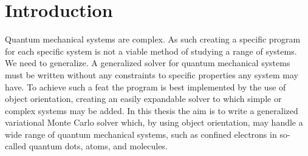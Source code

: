 \chapter*{Introduction}



Quantum mechanical systems are complex. As such creating a specific
program for each specific system is not a viable method of studying a
range of systems. We need to generalize. A generalized solver for
quantum mechanical systems must be written without any constraints to
specific properties any system may have. To achieve such a feat the
program is best implemented by the use of object orientation, creating
an easily expandable solver to which simple or complex systems may be
added. In this thesis the aim is to write a generalized variational
Monte Carlo solver which, by using object orientation, may handle a
wide range of quantum mechanical systems, such as confined electrons
in so-called quantum dots, atoms, and molecules.

